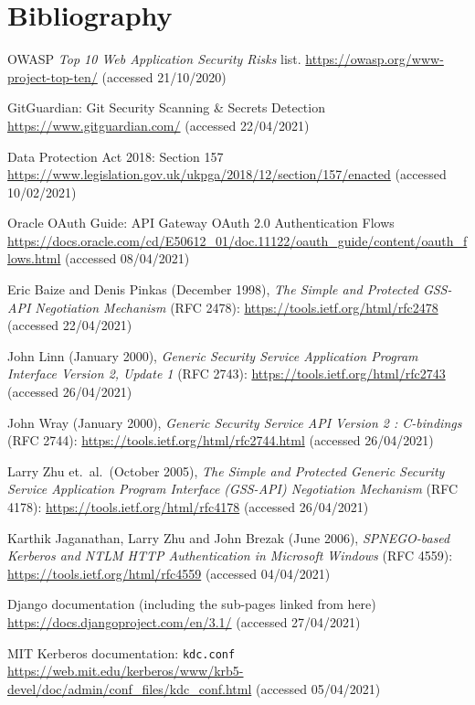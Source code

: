 \documentclass{article}
\begin{document}
\section*{Bibliography}
\begin{thebibliography}{9}
 OWASP \textit{Top 10 Web Application Security Risks} list. \url{https://owasp.org/www-project-top-ten/} (accessed 21/10/2020)

 GitGuardian: Git Security Scanning \& Secrets Detection \url{https://www.gitguardian.com/} (accessed 22/04/2021)

 Data Protection Act 2018: Section 157 \url{https://www.legislation.gov.uk/ukpga/2018/12/section/157/enacted} (accessed 10/02/2021)

 Oracle OAuth Guide: API Gateway OAuth 2.0 Authentication Flows \url{https://docs.oracle.com/cd/E50612_01/doc.11122/oauth_guide/content/oauth_flows.html} (accessed 08/04/2021)

 Eric Baize and Denis Pinkas (December 1998), \textit{The Simple and Protected GSS-API Negotiation Mechanism} (RFC 2478): \url{https://tools.ietf.org/html/rfc2478} (accessed 22/04/2021)

 John Linn (January 2000), \textit{Generic Security Service Application Program Interface Version 2, Update 1} (RFC 2743): \url{https://tools.ietf.org/html/rfc2743} (accessed 26/04/2021)

 John Wray (January 2000), \textit{Generic Security Service API Version 2 : C-bindings} (RFC 2744): \url{https://tools.ietf.org/html/rfc2744.html} (accessed 26/04/2021)

 Larry Zhu et.\ al.\ (October 2005), \textit{The Simple and Protected Generic Security Service Application Program Interface (GSS-API) Negotiation Mechanism} (RFC 4178): \url{https://tools.ietf.org/html/rfc4178} (accessed 26/04/2021)

 Karthik Jaganathan, Larry Zhu and John Brezak (June 2006), \textit{SPNEGO-based Kerberos and NTLM HTTP Authentication in Microsoft Windows} (RFC 4559): \url{https://tools.ietf.org/html/rfc4559} (accessed 04/04/2021)

 Django documentation (including the sub-pages linked from here) \url{https://docs.djangoproject.com/en/3.1/} (accessed 27/04/2021)

 MIT Kerberos documentation: \texttt{kdc.conf} \url{https://web.mit.edu/kerberos/www/krb5-devel/doc/admin/conf_files/kdc_conf.html} (accessed 05/04/2021)


\end{thebibliography}
\end{document}
